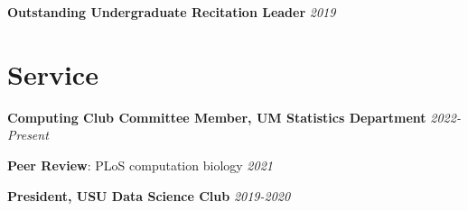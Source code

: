 \documentclass[11pt] {article}
\begin{document}
\hspace{5mm}\textbf{Outstanding Undergraduate Recitation Leader} \hfill  {\textit{2019}}

\noindent\hspace{5mm}{\it USU Mathematics and Statistics Department}

\section*{Service}
\noindent \textbf{Computing Club Committee Member, UM Statistics Department} \hfill  {\textit{2022-Present}}

\vspace{2mm}
\noindent \textbf{Peer Review}: PLoS computation biology \hfill {\it 2021}

\vspace{2mm}
\noindent \textbf{President, USU Data Science Club} \hfill  {\textit{2019-2020}}
\end{document}
